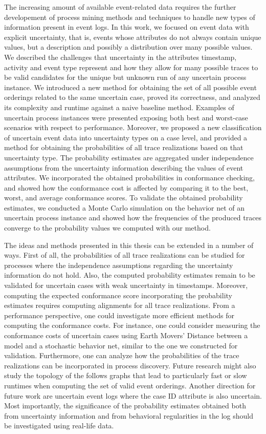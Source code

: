 The increasing amount of available event-related data requires the further developement of process mining methods and techniques to handle new types of information present in event logs.
In this work, we focused on event data with explicit uncertainty, that is, events whose attributes do not always contain unique values, but a description and possibly a distribution over many possible values.
We described the challenges that uncertainty in the attributes timestamp, activity and event type represent and how they allow for many possible traces to be valid candidates for the unique but unknown run of any uncertain process instance.
We introduced a new method for obtaining the set of all possible event orderings related to the same uncertain case, proved its correctness, and analyzed its complexity and runtime against a naive baseline method.
Examples of uncertain process instances were presented exposing both best and worst-case scenarios with respect to performance.
Moreover, we proposed a new classification of uncertain event data into uncertainty types on a case level, and provided a method for obtaining the probabilities of all trace realizations based on that uncertainty type.
The probability estimates are aggregated under independence assumptions from the uncertainty information describing the values of event attributes.
We incorporated the obtained probabilities in conformance checking, and showed how the conformance cost is affected by comparing it to the best, worst, and average conformance scores.
To validate the obtained probability estimates, we conducted a Monte Carlo simulation on the behavior net of an uncertain process instance and showed how the frequencies of the produced traces converge to the probability values we computed with our method.

The ideas and methods presented in this thesis can be extended in a number of ways.
First of all, the probabilities of all trace realizations can be studied for processes where the independence assumptions regarding the uncertainty information do not hold.
Also, the computed probability estimates remain to be validated for uncertain cases with weak uncertainty in timestamps.
Moreover, computing the expected conformance score incorporating the probability estimates requires computing alignments for all trace realizations.
From a performance perspective, one could investigate more efficient methods for computing the conformance costs.
For instance, one could consider measuring the conformance costs of uncertain cases using Earth Movers' Distance between a model and a stochastic behavior net, similar to the one we constructed for validation.
Furthermore, one can analyze how the probabilities of the trace realizations can be incorporated in process discovery.
Future research might also study the topology of the follows graphs that lead to particularly fast or slow runtimes when computing the set of valid event orderings.
Another direction for future work are uncertain event logs where the case ID attribute is also uncertain.
Most importantly, the significance of the probability estimates obtained both from uncertainty information and from behavioral regularities in the log should be investigated using real-life data.
